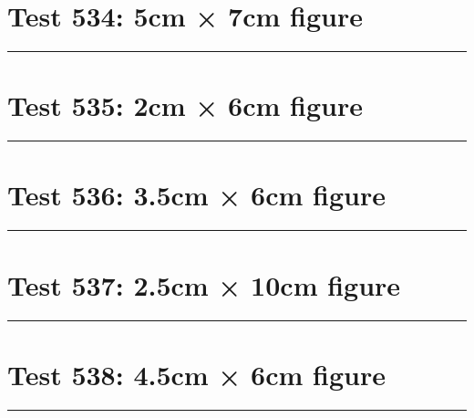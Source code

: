 \documentclass[a4paper,11pt]{article}
\begin{document}
\section*{Test 534: 5cm × 7cm figure}
\begin{swarmwrap}%
  \begin{minipage}[t]{5cm}
    \centering
    \rule{\linewidth}{7cm}
  \end{minipage}%
\end{swarmwrap}%
\swarmwrapnext
\lipsum[76]
\lipsum[77]
\lipsum[78]
\lipsum[79]
\section*{Test 535: 2cm × 6cm figure}
\begin{swarmwrap}%
  \begin{minipage}[t]{2cm}
    \centering
    \rule{\linewidth}{6cm}
  \end{minipage}%
\end{swarmwrap}%
\swarmwrapnext
\lipsum[90]
\lipsum[91]
\lipsum[92]
\section*{Test 536: 3.5cm × 6cm figure}
\begin{swarmwrap}%
  \begin{minipage}[t]{3cm}
    \centering
    \rule{\linewidth}{6cm}
  \end{minipage}%
\end{swarmwrap}%
\swarmwrapnext
\lipsum[56]
\lipsum[57]
\lipsum[58]
\lipsum[59]
\lipsum[60]
\lipsum[61]
\section*{Test 537: 2.5cm × 10cm figure}
\begin{swarmwrap}%
  \begin{minipage}[t]{2cm}
    \centering
    \rule{\linewidth}{10cm}
  \end{minipage}%
\end{swarmwrap}%
\swarmwrapnext
\lipsum[145]
\lipsum[146]
\lipsum[147]
\lipsum[148]
\lipsum[149]
\section*{Test 538: 4.5cm × 6cm figure}
\begin{swarmwrap}%
  \begin{minipage}[t]{4cm}
    \centering
    \rule{\linewidth}{6cm}
  \end{minipage}%
\end{swarmwrap}%
\swarmwrapnext
\lipsum[29]
\lipsum[30]
\lipsum[31]
\lipsum[32]
\end{document}
